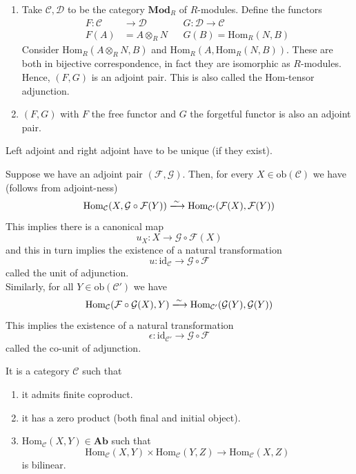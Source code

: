 \documentclass[oneside, 12pt, ]{scrbook}
\newcommand{\Hom}{\mathrm{Hom}}
\theoremstyle{theorem}
\begin{document}
\begin{example}
\begin{enumerate}
\item Take $\mathcal{C,D}$ to be the category $\mathbf{Mod}_{R}$ of $R$-modules. Define the functors 
\begin{align*}
F: \mathcal{C} &\rightarrow \mathcal{D} & & G: \mathcal{D} \rightarrow \mathcal{C} \\
F(A) &= A \otimes_{R} N & & G(B) = \Hom_{R}(N,B)
\end{align*}
Consider $\Hom_{R}(A \otimes_{R} N , B)$ and $\Hom_{R}(A, \Hom_{R}(N,B))$. These are both in bijective correspondence, in fact they are isomorphic as $R$-modules. Hence, $(F,G)$ is an adjoint pair. This is also called the Hom-tensor adjunction.
\item $(F,G)$ with $F$ the free functor and $G$ the forgetful functor is also an adjoint pair. 
\end{enumerate}
\end{example}

\begin{proposition}
Left adjoint and right adjoint have to be unique (if they exist).
\end{proposition}

Suppose we have an adjoint pair $(\mathcal{F}, \mathcal{G})$. Then, for every $X \in \mathrm{ob}(\mathcal{C})$ we have (follows from adjoint-ness) $$\mathrm{Hom}_{\mathcal{C}}(X, \mathcal{G}\circ \mathcal{F}(Y)) \xlongrightarrow{\sim} \mathrm{Hom}_{\mathcal{C}'}(\mathcal{F}(X),\mathcal{F}(Y))$$
This implies there is a canonical map $$u_{X}: X \rightarrow \mathcal{G} \circ \mathcal{F}(X)$$ and this in turn implies the existence of a natural transformation $$u: \mathrm{id}_{\mathcal{C}} \rightarrow \mathcal{G} \circ \mathcal{F}$$ called the unit of adjunction. \\
Similarly, for all $Y \in \mathrm{ob}(\mathcal{C}')$ we have 
$$\mathrm{Hom}_{\mathcal{C}}(\mathcal{F}\circ \mathcal{G}(X), Y) \xlongrightarrow{\sim} \mathrm{Hom}_{\mathcal{C}'}(\mathcal{G}(Y),\mathcal{G}(Y))$$
This implies the existence of a natural transformation $$\epsilon : \mathrm{id}_{\mathcal{C}'} \rightarrow \mathcal{G} \circ \mathcal{F}$$ called the co-unit of adjunction.


\begin{definition}
It is a category $\mathcal{C}$ such that 
\begin{enumerate}
\item it admits finite coproduct.
\item it has a zero product (both final and initial object).
\item $\mathrm{Hom}_{\mathcal{C}}(X,Y) \in \mathbf{Ab}$ such that $$\mathrm{Hom}_{\mathcal{C}}(X,Y) \times \mathrm{Hom}_{\mathcal{C}}(Y,Z) \rightarrow \mathrm{Hom}_{\mathcal{C}}(X,Z)$$ is bilinear.
\end{enumerate}
\end{definition}
\end{document}
